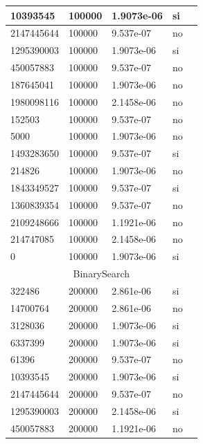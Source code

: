 \documentclass[12pt, fleqn]{article}                             %
\theoremstyle{break}                                            %
\begin{document}
\begin{longtable}{|m{5em}|m{5em}|m{10em}|m{5em}|@{}m{0pt}@{}}
            10393545& 100000  & 1.9073e-06 & si &\\[1em]    \hline
            2147445644& 100000  & 9.537e-07 & no &\\[1em]    \hline
            1295390003& 100000  & 1.9073e-06 & si &\\[1em]    \hline
            450057883& 100000  & 9.537e-07 & no &\\[1em]    \hline
            187645041& 100000  & 1.9073e-06 & no &\\[1em]    \hline
            1980098116& 100000  & 2.1458e-06 & no &\\[1em]    \hline
            152503& 100000  & 9.537e-07 & no &\\[1em]    \hline
            5000& 100000  & 1.9073e-06 & no &\\[1em]    \hline
            1493283650& 100000  & 9.537e-07 & si &\\[1em]    \hline
            214826& 100000  & 1.9073e-06 & no &\\[1em]    \hline
            1843349527& 100000  & 9.537e-07 & si &\\[1em]    \hline
            1360839354& 100000  & 9.537e-07 & no &\\[1em]    \hline
            2109248666& 100000  & 1.1921e-06 & no &\\[1em]    \hline
            214747085& 100000  & 2.1458e-06 & no &\\[1em]    \hline
            0& 100000  & 1.9073e-06 & si &\\[1em]    \hline
            \multicolumn{5}{|c|}{BinarySearch}   \\          \hline
            322486& 200000  & 2.861e-06 & si &\\[1em]    \hline
            14700764& 200000  & 2.861e-06 & no &\\[1em]    \hline
            3128036& 200000  & 1.9073e-06 & si &\\[1em]    \hline
            6337399& 200000  & 1.9073e-06 & si &\\[1em]    \hline
            61396& 200000  & 9.537e-07 & no &\\[1em]    \hline
            10393545& 200000  & 1.9073e-06 & si &\\[1em]    \hline
            2147445644& 200000  & 9.537e-07 & no &\\[1em]    \hline
            1295390003& 200000  & 2.1458e-06 & si &\\[1em]    \hline
            450057883& 200000  & 1.1921e-06 & no &\\[1em]    \hline

\end{longtable}
\end{document}
